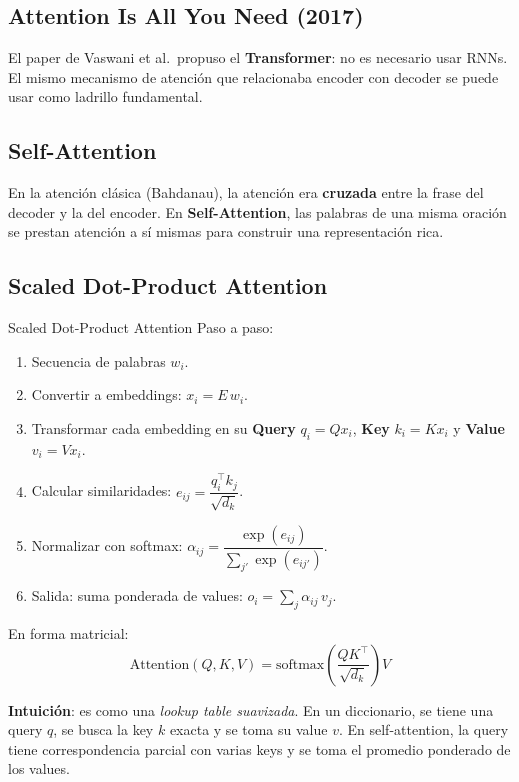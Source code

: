 \documentclass[12pt, a4paper]{article}
\begin{document}
\subsection{Attention Is All You Need (2017)}

El paper de Vaswani et al.\ propuso el \textbf{Transformer}: no es necesario usar RNNs. El mismo mecanismo de atención que relacionaba encoder con decoder se puede usar como ladrillo fundamental.

\subsection{Self-Attention}

En la atención clásica (Bahdanau), la atención era \textbf{cruzada} entre la frase del decoder y la del encoder. En \textbf{Self-Attention}, las palabras de una misma oración se prestan atención a sí mismas para construir una representación rica.

\subsection{Scaled Dot-Product Attention}

\begin{defbox}{Scaled Dot-Product Attention}
	Paso a paso:
	\begin{enumerate}
		\item Secuencia de palabras $w_i$.
		\item Convertir a embeddings: $x_i = E \, w_i$.
		\item Transformar cada embedding en su \textbf{Query} $q_i = Q x_i$, \textbf{Key} $k_i = K x_i$ y \textbf{Value} $v_i = V x_i$.
		\item Calcular similaridades: $e_{ij} = \dfrac{q_i^\top k_j}{\sqrt{d_k}}$.
		\item Normalizar con softmax: $\alpha_{ij} = \dfrac{\exp(e_{ij})}{\sum_{j'} \exp(e_{ij'})}$.
		\item Salida: suma ponderada de values: $o_i = \sum_j \alpha_{ij} \, v_j$.
	\end{enumerate}

	En forma matricial:
	\[
		\text{Attention}(Q,K,V) = \text{softmax}\!\left(\frac{QK^\top}{\sqrt{d_k}}\right) V
	\]
\end{defbox}

\textbf{Intuición}: es como una \emph{lookup table suavizada}. En un diccionario, se tiene una query $q$, se busca la key $k$ exacta y se toma su value $v$. En self-attention, la query tiene correspondencia parcial con varias keys y se toma el promedio ponderado de los values.
\end{document}
